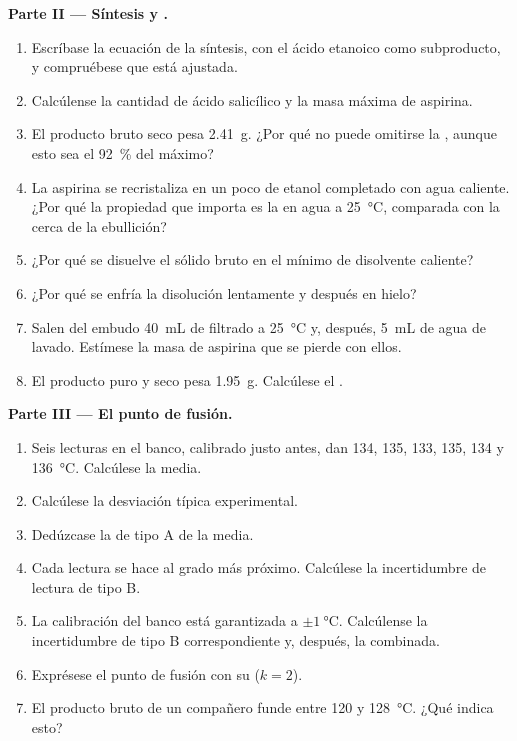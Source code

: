 \begin{problem}
\noindent\textbf{Parte II --- Síntesis y .}
\begin{enumerate}[resume]
  \item Escríbase la ecuación de la síntesis, con el ácido etanoico
         como subproducto, y compruébese que está ajustada.
  \item Calcúlense la cantidad de ácido salicílico y la masa máxima de
        aspirina.
  \item El producto bruto seco pesa \qty{2.41}{g}. ¿Por qué no puede
        omitirse la , aunque esto sea el
        \qty{92}{\percent} del máximo?
  \item La aspirina se recristaliza en un poco de etanol completado con
        agua caliente. ¿Por qué la propiedad que importa es la 
        en agua a \qty{25}{\celsius}, comparada con la  cerca de
        la ebullición?
  \item ¿Por qué se disuelve el sólido bruto en el mínimo de disolvente
        caliente?
  \item ¿Por qué se enfría la disolución lentamente y después en hielo?
  \item Salen del embudo \qty{40}{mL} de filtrado a \qty{25}{\celsius} y,
        después, \qty{5}{mL} de agua de lavado. Estímese la masa de
        aspirina que se pierde con ellos.
  \item El producto puro y seco pesa \qty{1.95}{g}. Calcúlese el
        .
\end{enumerate}

\noindent\textbf{Parte III --- El punto de fusión.}
\begin{enumerate}[resume]
  \item Seis lecturas en el banco, calibrado justo antes, dan 134, 135,
        133, 135, 134 y \qty{136}{\celsius}. Calcúlese la media.
  \item Calcúlese la desviación típica experimental.
  \item Dedúzcase la  de tipo A de la media.
  \item Cada lectura se hace al grado más próximo. Calcúlese la
        incertidumbre de lectura de tipo B.
  \item La calibración del banco está garantizada a
        $\pm\qty{1}{\celsius}$. Calcúlense la incertidumbre de tipo B
        correspondiente y, después, la  combinada.
  \item Exprésese el punto de fusión con su 
        ($k = 2$).
  \item El producto bruto de un compañero funde entre 120 y
        \qty{128}{\celsius}. ¿Qué indica esto?
\end{enumerate}


\end{problem}
